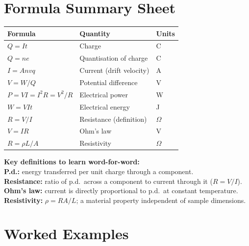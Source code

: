 \section{Formula Summary Sheet}

\begin{minipage}{\linewidth}
\begin{tcolorbox}[colback=lightgold, colframe=accentgold]
\renewcommand{\arraystretch}{1.8}
\begin{tabular}{@{}lll@{}}
\toprule
\textbf{Formula} & \textbf{Quantity} & \textbf{Units} \\
\midrule
$Q = It$ & Charge & C \\
$Q = ne$ & Quantisation of charge & C \\
$I = Anvq$ & Current (drift velocity) & A \\
$V = W/Q$ & Potential difference & V \\
$P = VI = I^2R = V^2/R$ & Electrical power & W \\
$W = VIt$ & Electrical energy & J \\
$R = V/I$ & Resistance (definition) & $\Omega$ \\
$V = IR$ & Ohm's law & V \\
$R = \rho L / A$ & Resistivity & $\Omega$ \\
\bottomrule
\end{tabular}
\end{tcolorbox}

\vspace{0.5em}
\begin{tcolorbox}[colback=lightblue, colframe=darkblue]
\textbf{Key definitions to learn word-for-word:}\\[0.3em]
\textbf{P.d.:} energy transferred per unit charge through a component.\\[0.2em]
\textbf{Resistance:} ratio of p.d.\ across a component to current through it ($R = V/I$).\\[0.2em]
\textbf{Ohm's law:} current is directly proportional to p.d.\ at constant temperature.\\[0.2em]
\textbf{Resistivity:} $\rho = RA/L$; a material property independent of sample dimensions.
\end{tcolorbox}
\end{minipage}


\pagebreak

\section{Worked Examples}

